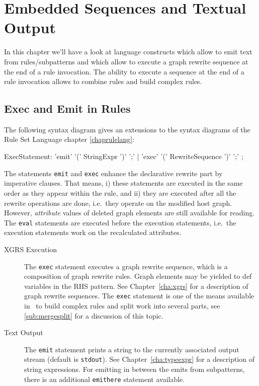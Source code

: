 \chapter{Embedded Sequences and Textual Output}
\label{cha:imperativeandstate}
\label{sct:imperative}

In this chapter we'll have a look at language constructs which allow to emit text from rules/subpatterns and which allow to execute a graph rewrite sequence at the end of a rule invocation.
The ability to execute a sequence at the end of a rule invocation allows to combine rules and build complex rules.


\section{Exec and Emit in Rules}

The following syntax diagram gives an extensions to the syntax diagrams of the Rule Set Language chapter \ref{chaprulelang}:
\begin{rail}
  ExecStatement: 'emit' '(' StringExpr ')' ';' | 'exec' '(' RewriteSequence ')' ';'
	;
\end{rail}
The statements \texttt{emit} and \texttt{exec} enhance the declarative rewrite part by imperative clauses.
That means, i) these statements are executed in the same order as they appear within the rule,
and ii) they are executed after all the rewrite operations are done, i.e.\ they operate on the modified host graph.
However, \emph{attribute} values of deleted graph elements are still available for reading.
The \texttt{eval} statements are executed before the execution statements, i.e.\ the execution statements work on the recalculated attributes.
\begin{description}
  \item[XGRS Execution] The \texttt{exec} statement executes a graph rewrite sequence, which is a composition of graph rewrite rules. Graph elements may be yielded to def variables in the RHS pattern. See Chapter~\ref{cha:xgrs} for a description of graph rewrite sequences. The \texttt{exec} statement is one of the means available in \GrG~to build complex rules and split work into several parts, see \ref{sub:mergesplit} for a discussion of this topic.
  \item[Text Output] The \texttt{emit} statement prints a string to the currently associated output stream (default is \texttt{stdout}). See Chapter~\ref{cha:typeexpr} for a description of string expressions.
  For emitting in between the emits from subpatterns, there is an additional \texttt{emithere} statement available.
\end{description}

